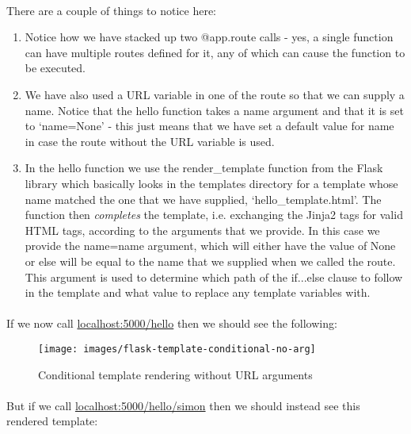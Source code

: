 \documentclass[12pt, a4paper, twoside]{book}
\begin{document}
\paragraph{} There are a couple of things to notice here:
\begin{enumerate}
\item Notice how we have stacked up two @app.route calls - yes, a single function can have multiple routes defined for it, any of which can cause the function to be executed.
\item We have also used a URL variable in one of the route so that we can supply a name. Notice that the hello function takes a name argument and that it is set to `name=None' - this just means that we have set a default value for name in case the route without the URL variable is used.
\item In the hello function we use the render\_template function from the Flask library which basically looks in the templates directory for a template whose name matched the one that we have supplied, `hello\_template.html'. The function then \emph{completes} the template, i.e. exchanging the Jinja2 tags for valid HTML tags, according to the arguments that we provide. In this case we provide the name=name argument, which will either have the value of None or else will be equal to the name that we supplied when we called the route. This argument is used to determine which path of the if...else clause to follow in the template and what value to replace any template variables with.
\end{enumerate}

\paragraph{} If we now call \url{localhost:5000/hello} then we should see the following:

\begin{figure}[H]
\centering
\texttt{[image: images/flask-template-conditional-no-arg]}
\caption{Conditional template rendering without URL arguments}
\label{fig:flask-template-conditional-no-arg}
\end{figure}

\paragraph{} But if we call \url{localhost:5000/hello/simon} then we should instead see this rendered template:
\end{document}
